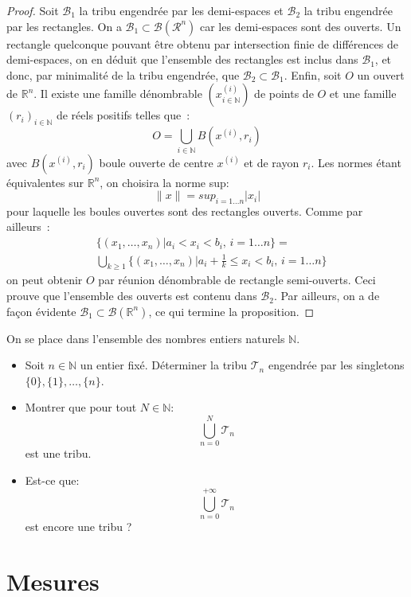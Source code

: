 \begin{proof}
Soit $\mathcal{B}_1$ la tribu engendrée par les
demi-espaces et $\mathcal{B}_2$ la tribu engendrée par les
rectangles. On a $\mathcal{B}_1 \subset \mathcal{B}(\mathcal{R}^n)$
car les demi-espaces sont des ouverts. Un rectangle quelconque pouvant
être obtenu par intersection finie de différences de demi-espa\-ces, on
en déduit que l'ensemble des rectangles est inclus dans
$\mathcal{B}_1$, et donc, par minimalité de la tribu engendrée, que
$\mathcal{B}_2 \subset \mathcal{B}_1$.
Enfin, soit $O$ un ouvert de $\mathbb{R}^n$. Il existe une famille
dénombrable $(x^{(i)}_{i \in \mathbb{N}})$ de points de $O$ et une famille
$(r_i)_{i \in \mathbb{N}}$ de réels positifs telles que~:
\[
O = \bigcup_{i \in \mathbb{N}} B(x^{(i)}, r_i)
\]
avec $B(x^{(i)}, r_i)$ boule ouverte de centre $x^{(i)}$ et de rayon
$r_i$. Les normes étant équivalentes sur $\mathbb{R}^n$, on 
choisira la norme sup:
$$\| x \| = sup_{i=1\dots n}
|x_i|$$
 pour laquelle les boules ouvertes sont des rectangles
ouverts. Comme par ailleurs~:
\begin{align*}
&\{ (x_1,\dots ,x_n) | a_i <  x_i < b_i, \, i=1\dots n \}  = \\
&\bigcup_{k \geq 1} \{ (x_1,\dots ,x_n) | a_i + \frac{1}{k} \leq  x_i < b_i, \,
i=1\dots n \}
\end{align*}
on peut obtenir $O$ par réunion dénombrable de rectangle
semi-ouverts. Ceci prouve que l'ensemble des ouverts est contenu dans
$\mathcal{B}_2$. Par ail\-leurs, on a de façon évidente $\mathcal{B}_1
\subset \mathcal{B}(\mathbb{R}^n)$, ce qui termine la proposition.
\end{proof}
\begin{exercice}
On se place dans l'ensemble des nombres entiers naturels $\mathbb{N}$. 
 \begin{itemize}
  \item Soit $n \in \mathbb{N}$ un entier fixé. Déterminer la tribu
  $\mathcal{T}_n$ engendrée par les singletons $\{0\},\{1\},\dots,\{n\}$.
  \item Montrer que pour tout $N \in \mathbb{N}$:
  \[
  	\bigcup_{n=0}^N \mathcal{T}_n
  \]
  est une tribu.
  \item Est-ce que:
    \[
  	\bigcup_{n=0}^{+\infty} \mathcal{T}_n
  \]
  est encore une tribu ?
\end{itemize}
\end{exercice}
\section{Mesures}
